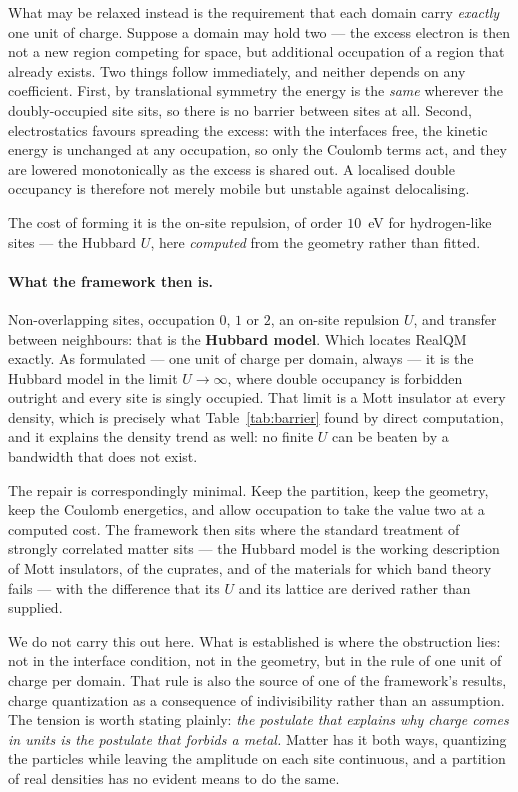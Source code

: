 \documentclass[11pt]{article}
\begin{document}
What may be relaxed instead is the requirement that each domain carry \emph{exactly} one unit of
charge. Suppose a domain may hold two --- the excess electron is then not a new region competing for
space, but additional occupation of a region that already exists. Two things follow immediately, and
neither depends on any coefficient. First, by translational symmetry the energy is the \emph{same}
wherever the doubly-occupied site sits, so there is no barrier between sites at all. Second,
electrostatics favours spreading the excess: with the interfaces free, the kinetic energy is
unchanged at any occupation, so only the Coulomb terms act, and they are lowered monotonically as the
excess is shared out. A localised double occupancy is therefore not merely mobile but unstable
against delocalising.

The cost of forming it is the on-site repulsion, of order $10$~eV for hydrogen-like sites --- the
Hubbard $U$, here \emph{computed} from the geometry rather than fitted.

\paragraph{What the framework then is.}\label{sec:hubbard} Non-overlapping sites, occupation $0$, $1$ or $2$, an on-site
repulsion $U$, and transfer between neighbours: that is the \textbf{Hubbard model}. Which locates
RealQM exactly. As formulated --- one unit of charge per domain, always --- it is the Hubbard model in
the limit $U\to\infty$, where double occupancy is forbidden outright and every site is singly
occupied. That limit is a Mott insulator at every density, which is precisely what
Table~\ref{tab:barrier} found by direct computation, and it explains the density trend as well: no
finite $U$ can be beaten by a bandwidth that does not exist.

The repair is correspondingly minimal. Keep the partition, keep the geometry, keep the Coulomb
energetics, and allow occupation to take the value two at a computed cost. The framework then sits
where the standard treatment of strongly correlated matter sits --- the Hubbard model is the working
description of Mott insulators, of the cuprates, and of the materials for which band theory fails ---
with the difference that its $U$ and its lattice are derived rather than supplied.

We do not carry this out here. What is established is where the obstruction lies: not in the
interface condition, not in the geometry, but in the rule of one unit of charge per domain. That rule
is also the source of one of the framework's results, charge quantization as a consequence of
indivisibility rather than an assumption. The tension is worth stating plainly: \emph{the postulate
that explains why charge comes in units is the postulate that forbids a metal.} Matter has it both
ways, quantizing the particles while leaving the amplitude on each site continuous, and a partition
of real densities has no evident means to do the same.
\end{document}
